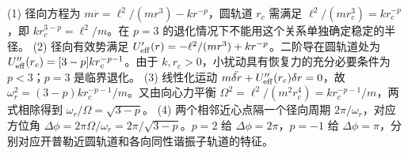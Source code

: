 (1) 径向方程为 \(m\ddot r=\ell^2/(mr^3)-kr^{-p}\)，圆轨道 \(r_c\) 需满足 \(\ell^2/(mr_c^3)=kr_c^{-p}\)，即 \(kr_c^{3-p}=\ell^2/m\)。在 \(p=3\) 的退化情况下不能用这个关系单独确定稳定的半径。
(2) 径向有效势满足 \(U_{\rm eff}'(r)=-\ell^2/(mr^3)+kr^{-p}\)。二阶导在圆轨道处为 \(U_{\rm eff}''(r_c)=[3-p]kr_c^{-p-1}\)。由于 \(k,r_c>0\)，小扰动具有恢复力的充分必要条件为 \(p<3\)；\(p=3\) 是临界退化。
(3) 线性化运动 \(m\ddot{\delta r}+U_{\rm eff}''(r_c)\delta r=0\)，故 \(\omega_r^2=(3-p)kr_c^{-p-1}/m\)。又由向心力平衡 \(\Omega^2=\ell^2/(m^2r_c^4)=kr_c^{-p-1}/m\)，两式相除得到 \(\omega_r/\Omega=\sqrt{3-p}\)。
(4) 两个相邻近心点隔一个径向周期 \(2\pi/\omega_r\)，对应方位角 \(\Delta\phi=2\pi\Omega/\omega_r=2\pi/\sqrt{3-p}\)。\(p=2\) 给 \(\Delta\phi=2\pi\)，\(p=-1\) 给 \(\Delta\phi=\pi\)，分别对应开普勒近圆轨道和各向同性谐振子轨道的特征。
